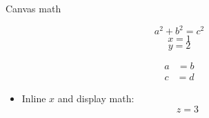 \documentclass[aspectratio=169]{beamer}
\begin{document}
\begin{frame}[label=math]{Canvas math}
\begin{deckcanvas}
\begin{decktext}[x=0.000,y=0.000,w=0.450,size=normal]
\[a^2+b^2=c^2\]
\begin{equation}x=1\end{equation}
\begin{equation*}y=2\end{equation*}
\end{decktext}
\begin{decktext}[x=0.500,y=0.000,w=0.450,size=normal]
\begin{align}a &= b\end{align}
\begin{align*}c &= d\end{align*}
\begin{itemize}
\item Inline $x$ and display math:
\[z=3\]
\end{itemize}
\end{decktext}
\end{deckcanvas}
\end{frame}
\end{document}
